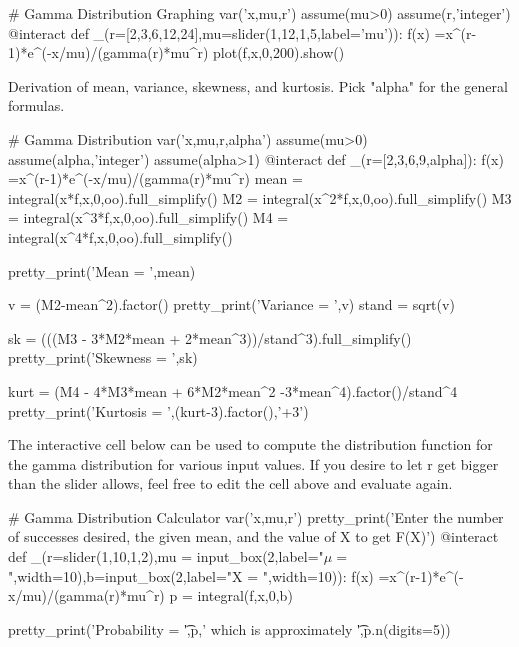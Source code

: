 \documentclass[10pt,]{book}
\numberwithin{equation}{section}
\begin{document}
%
\par
\hypertarget{p-1155}{}%
\leavevmode%
%
\par
\hypertarget{p-1156}{}%
\leavevmode%
\begin{sageinput}
# Gamma Distribution Graphing
var('x,mu,r')
assume(mu>0)
assume(r,'integer')
@interact
def _(r=[2,3,6,12,24],mu=slider(1,12,1,5,label='mu')):
    f(x) =x^(r-1)*e^(-x/mu)/(gamma(r)*mu^r)
    plot(f,x,0,200).show()
\end{sageinput}
%
\par
\hypertarget{p-1157}{}%
Derivation of mean, variance, skewness, and kurtosis. Pick "alpha" for the general formulas. \leavevmode%
\begin{sageinput}
# Gamma Distribution
var('x,mu,r,alpha')
assume(mu>0)
assume(alpha,'integer')
assume(alpha>1)
@interact
def _(r=[2,3,6,9,alpha]):
    f(x) =x^(r-1)*e^(-x/mu)/(gamma(r)*mu^r)
    mean = integral(x*f,x,0,oo).full_simplify()
    M2 = integral(x^2*f,x,0,oo).full_simplify()
    M3 = integral(x^3*f,x,0,oo).full_simplify()
    M4 = integral(x^4*f,x,0,oo).full_simplify()
    
    pretty_print('Mean = ',mean)
    
    v = (M2-mean^2).factor()
    pretty_print('Variance = ',v)
    stand = sqrt(v)
    
    sk = (((M3 - 3*M2*mean + 2*mean^3))/stand^3).full_simplify()
    pretty_print('Skewness = ',sk)
    
    kurt = (M4 - 4*M3*mean + 6*M2*mean^2 -3*mean^4).factor()/stand^4
    pretty_print('Kurtosis = ',(kurt-3).factor(),'+3')
\end{sageinput}
%
\par
\hypertarget{p-1158}{}%
The interactive cell below can be used to compute the distribution function for the gamma distribution for various input values. If you desire to let r get bigger than the slider allows, feel free to edit the cell above and evaluate again. \leavevmode%
\begin{sageinput}
# Gamma Distribution Calculator
var('x,mu,r')
pretty_print('Enter the number of successes desired, the given mean, and the value of X to get F(X)')
@interact
def _(r=slider(1,10,1,2),mu = input_box(2,label="$\mu = $",width=10),b=input_box(2,label="X = ",width=10)):
    f(x) =x^(r-1)*e^(-x/mu)/(gamma(r)*mu^r)
    p = integral(f,x,0,b)
    
    pretty_print('Probability = \t',p,' which is approximately \t',p.n(digits=5))
\end{sageinput}
\end{document}
